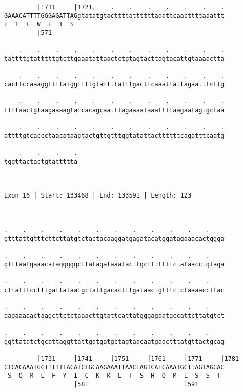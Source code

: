 \documentclass{article}
\begin{document}
\begin{Verbatim}
         |1711     |1721.    .    .    .    .    .    .    .
GAAACATTTTGGGAGATTAGgtatatgtacttttattttttaaattcaacttttaaattt
E  T  F  W  E  I  S                                         
         |571                                               
  
    .    .    .    .    .    .    .    .    .    .    .    .
tattttgtatttttgtcttgaaatattaactctgtagtacttagtacattgtaaaactta
                                                            
    .    .    .    .    .    .    .    .    .    .    .    .
cacttccaaaggttttatggttttgtattttatttgacttcaaattattagaatttcttg
                                                            
    .    .    .    .    .    .    .    .    .    .    .    .
ttttaactgtaagaaaagtatcacagcaatttagaaaataaattttaagaatagtgctaa
                                                            
    .    .    .    .    .    .    .    .    .    .    .    .
attttgtcaccctaacataagtactgttgtttggtatattacttttttcagatttcaatg
                                                            
    .    .    .    .
tggttactactgtattttta
                    
                    
 
Exon 16 | Start: 133468 | End: 133591 | Length: 123



.    .    .    .    .    .    .    .    .    .    .    .    
gtttattgtttcttcttatgtctactacaaggatgagatacatggatagaaacactggga
                                                            
.    .    .    .    .    .    .    .    .    .    .    .    
gtttaatgaaacatagggggcttatagataaatacttgctttttttctataacctgtaga
                                                            
.    .    .    .    .    .    .    .    .    .    .    .    
cttatttcctttgattataatgctattgacactttgataactgtttctctaaaaccttac
                                                            
.    .    .    .    .    .    .    .    .    .    .    .    
aagaaaaactaagcttctctaaacttgtattcattatgggagaatgccattcttatgtct
                                                            
.    .    .    .    .    .    .    .    .    .    .    .    
ggttatatctgcattaggttattgatgatgctagtaacaatgaactttatgttactgcag
                                                            
         |1731     |1741     |1751     |1761     |1771     |1781
CTCACAAATGCTTTTTTACATCTGCAAGAAATTAACTAGTCATCAAATGCTTAGTAGCAC
 S  Q  M  L  F  Y  I  C  K  K  L  T  S  H  Q  M  L  S  S  T 
                   |581                          |591       
  

\end{Verbatim}
\end{document}
